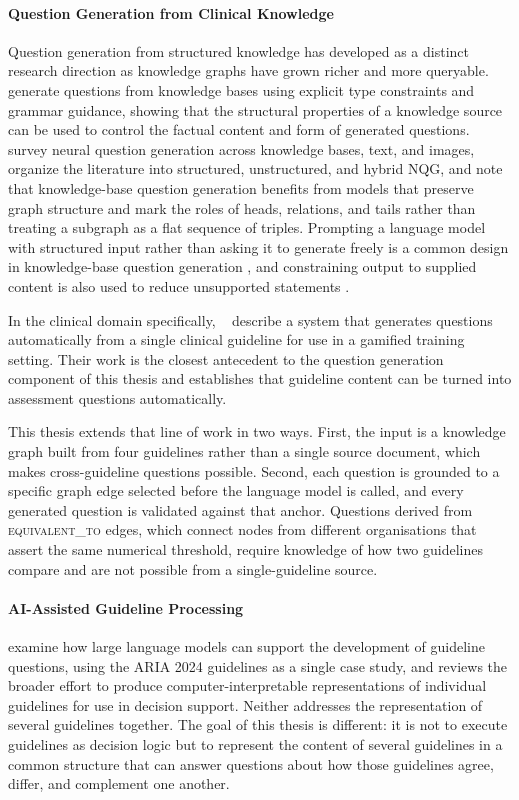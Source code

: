 \paragraph{Question Generation from Clinical Knowledge}
\label{sec:bg-related-qg}

Question generation from structured knowledge has developed as a distinct
research direction as knowledge graphs have grown richer and more queryable.
~\cite{bi2020} generate questions from knowledge bases using
explicit type constraints and grammar guidance, showing that the structural
properties of a knowledge source can be used to control the factual content
and form of generated questions. ~\cite{guo2024} survey neural question generation across knowledge bases, text, and images,
organize the literature into structured, unstructured, and hybrid NQG, and
note that knowledge-base question generation benefits from models that
preserve graph structure and mark the roles of heads, relations, and tails
rather than treating a subgraph as a flat sequence of triples. Prompting a language model with structured input rather than asking it to
generate freely is a common design in knowledge-base question generation
\cite{liang2023}, and constraining output to supplied content is also used to
reduce unsupported statements \cite{huang2025}.

In the clinical domain specifically, ~\cite{nyameino2020}
describe a system that generates questions automatically from a single
clinical guideline for use in a gamified training setting. Their work is the
closest antecedent to the question generation component of this thesis and
establishes that guideline content can be turned into assessment questions
automatically.

This thesis extends that line of work in two ways. First, the input is a
knowledge graph built from four guidelines rather than a single source
document, which makes cross-guideline questions possible. Second, each
question is grounded to a specific graph edge selected before the language
model is called, and every generated question is validated against that
anchor. Questions derived from \textsc{equivalent\_to} edges, which connect
nodes from different organisations that assert the same numerical threshold,
require knowledge of how two guidelines compare and are not possible from a
single-guideline source.

\paragraph{AI-Assisted Guideline Processing}
\label{sec:bg-related-ai-guidelines}

\cite{sousa-pinto2024} examine how large language models can support the
development of guideline questions, using the ARIA 2024 guidelines as a single
case study, and \cite{peleg2013} reviews the broader effort to produce
computer-interpretable representations of individual guidelines for use in
decision support. Neither addresses the representation of several guidelines
together. The goal of this thesis is different: it is not to execute guidelines
as decision logic but to represent the content of several guidelines in a
common structure that can answer questions about how those guidelines agree,
differ, and complement one another.
